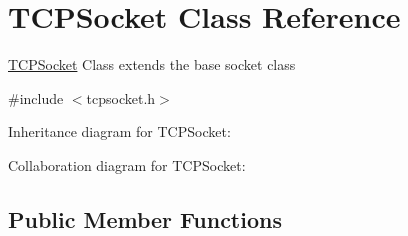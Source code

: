 \hypertarget{classTCPSocket}{}\section{T\+C\+P\+Socket Class Reference}
\label{classTCPSocket}


\hyperlink{classTCPSocket}{T\+C\+P\+Socket} Class extends the base socket class  




{\ttfamily \#include $<$tcpsocket.\+h$>$}



Inheritance diagram for T\+C\+P\+Socket\+:


Collaboration diagram for T\+C\+P\+Socket\+:
\subsection*{Public Member Functions}
